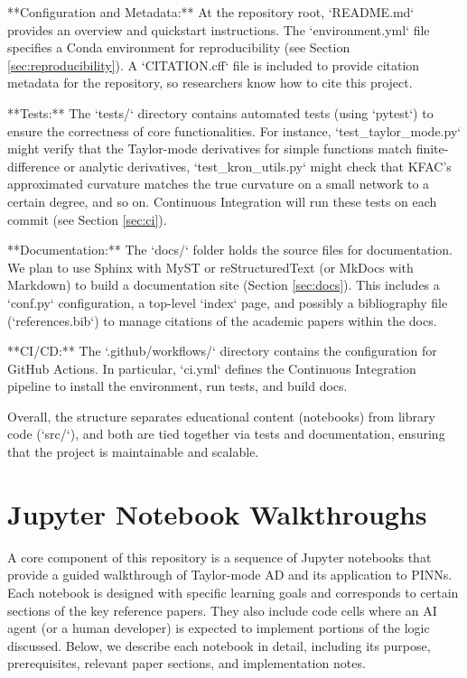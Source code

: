 \documentclass[11pt]{article}
\begin{document}
**Configuration and Metadata:** At the repository root, `README.md` provides an overview and quickstart instructions. The `environment.yml` file specifies a Conda environment for reproducibility (see Section \ref{sec:reproducibility}). A `CITATION.cff` file is included to provide citation metadata for the repository, so researchers know how to cite this project.

**Tests:** The `tests/` directory contains automated tests (using `pytest`) to ensure the correctness of core functionalities. For instance, `test_taylor_mode.py` might verify that the Taylor-mode derivatives for simple functions match finite-difference or analytic derivatives, `test_kron_utils.py` might check that KFAC's approximated curvature matches the true curvature on a small network to a certain degree, and so on. Continuous Integration will run these tests on each commit (see Section \ref{sec:ci}).

**Documentation:** The `docs/` folder holds the source files for documentation. We plan to use Sphinx with MyST or reStructuredText (or MkDocs with Markdown) to build a documentation site (Section \ref{sec:docs}). This includes a `conf.py` configuration, a top-level `index` page, and possibly a bibliography file (`references.bib`) to manage citations of the academic papers within the docs.

**CI/CD:** The `.github/workflows/` directory contains the configuration for GitHub Actions. In particular, `ci.yml` defines the Continuous Integration pipeline to install the environment, run tests, and build docs.

Overall, the structure separates educational content (notebooks) from library code (`src/`), and both are tied together via tests and documentation, ensuring that the project is maintainable and scalable.

\section{Jupyter Notebook Walkthroughs}
\label{sec:notebooks}

A core component of this repository is a sequence of Jupyter notebooks that provide a guided walkthrough of Taylor-mode AD and its application to PINNs. Each notebook is designed with specific learning goals and corresponds to certain sections of the key reference papers. They also include code cells where an AI agent (or a human developer) is expected to implement portions of the logic discussed. Below, we describe each notebook in detail, including its purpose, prerequisites, relevant paper sections, and implementation notes.
\end{document}
